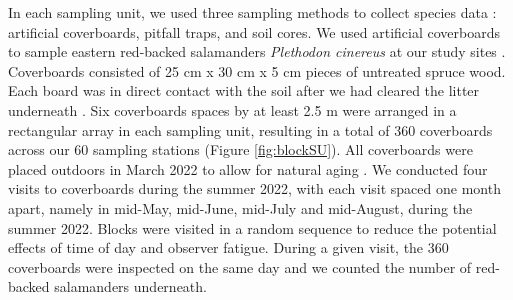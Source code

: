 In each sampling unit, we used three sampling methods to collect species data : artificial coverboards, pitfall traps, and soil cores.
We used artificial coverboards to sample eastern red-backed salamanders \textit{Plethodon cinereus} at our study sites \citep{hydeSamplingPlethodontidSalamanders2001,mooreComparisonPopulationEastern2009c,hesedUncoveringSalamanderEcology2012,Mazerolle2021Woodlandsalamander}. 
Coverboards consisted of 25 cm x 30 cm x 5 cm pieces of untreated spruce wood. Each board was in direct contact with the soil after we had cleared the litter underneath \citep{Mazerolle2021Woodlandsalamander}. 
Six coverboards spaces by at least 2.5 m were arranged in a rectangular array in each sampling unit, resulting in a total of 360 coverboards across our 60 sampling stations (Figure \ref{fig:blockSU}). 
All coverboards were placed outdoors in March 2022 to allow for natural aging \citep{hedrickEffectsCoverboardAge2021,Grasser2014Effectscover}. 
We conducted four visits to coverboards during the summer 2022, with each visit spaced one month apart, namely in mid-May, mid-June, mid-July and mid-August, during the summer 2022. 
Blocks were visited in a random sequence to reduce the potential effects of time of day and observer fatigue. 
During a given visit, the 360 coverboards were inspected on the same day and we counted the number of red-backed salamanders underneath.  

